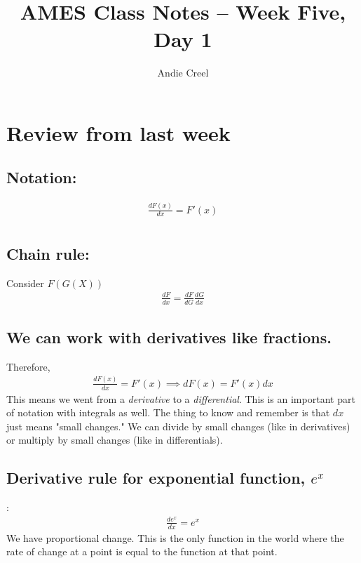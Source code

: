 \documentclass{article}
\title{AMES Class Notes -- Week Five, Day 1}
\author{Andie Creel}
\begin{document}
\maketitle

\section{Review from last week}

\subsection{Notation:}
\begin{align}
    \frac{dF(x)}{dx} = F'(x) \\
\end{align}

\subsection{Chain rule: } Consider $F(G(X))$
\begin{align}
    \frac{dF}{dx} = \frac{dF}{dG} \frac{dG}{dx}
\end{align}

\subsection{We can work with derivatives like fractions.} Therefore, 
\begin{align}
    \frac{dF(x)}{dx} = F'(x) \implies dF(x) = F'(x) dx
\end{align}
This means we went from a \textit{derivative} to a \textit{differential}. This is an important part of notation with integrals as well. The thing to know and remember is that $dx$ just means "small changes." We can divide by small changes (like in derivatives) or multiply by small changes (like in differentials). \\

\subsection{Derivative rule for exponential function, $e^x$}:
\begin{align}
    \frac{de^x}{dx} = e^x
\end{align}
We have proportional change. This is the only function in the world where the rate of change at a point is equal to the function at that point. \\
\end{document}
